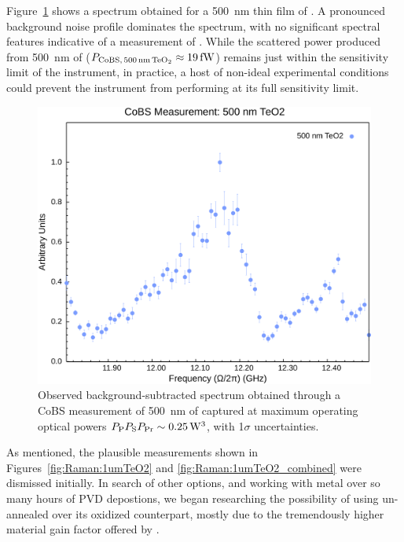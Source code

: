Figure~\ref{fig:Raman:500nmTeO2} shows a spectrum obtained for a \SI{500}{\nano\meter} thin film of . A pronounced background noise profile dominates the spectrum, with no significant spectral features indicative of a measurement of . While the scattered power produced from \SI{500}{\nano\meter} of  (\(P_{\rm CoBS,\,\SI{500}{\nano\meter}\,\ce{TeO2}} \approx \SI{19}{\femto\watt}\)) remains just within the sensitivity limit of the instrument, in practice, a host of non-ideal experimental conditions could prevent the instrument from performing at its full sensitivity limit.

\begin{figure}[t]
  \centering
  \hspace{-2em}\includegraphics[width=.85\textwidth]{figs/4-Raman/CoBS Measurement: 500 nm TeO2.png}
  \caption[Observed background-subtracted spectrum obtained through a \ac{CoBS} measurement of \SI{500}{\nano\meter} of .]{Observed background-subtracted spectrum obtained through a \ac{CoBS} measurement of \SI{500}{\nano\meter} of  captured at maximum operating optical powers \(P_{\rm P}P_{\rm S}P_{\rm Pr} \sim \SI{0.25}{\cubic\watt}\), with 1\(\sigma\) uncertainties.}
  \label{fig:Raman:500nmTeO2}
\end{figure}

As mentioned, the plausible measurements shown in Figures~\ref{fig:Raman:1umTeO2} and \ref{fig:Raman:1umTeO2_combined} were dismissed initially. In search of other options, and working with  metal over so many hours of \ac{PVD} depostions, we began researching the possibility of using un-annealed  over its oxidized counterpart, mostly due to the tremendously higher material gain factor offered by .

